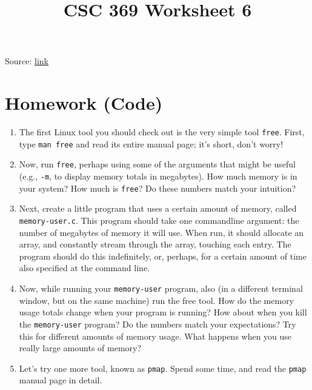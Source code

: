 \documentclass[12pt]{article}
\begin{document}
\title{CSC 369 Worksheet 6}
\maketitle

\bigskip

Source: \href{http://pages.cs.wisc.edu/~remzi/OSTEP/cpu-intro.pdf}{link}

\bigskip

\section{Homework (Code)}

\begin{enumerate}[1.]
    \item The first Linux tool you should check out is the very simple tool
    \texttt{free}. First, type \texttt{man free} and read its entire manual page; it’s
    short, don’t worry!

    \item Now, run \texttt{free}, perhaps using some of the arguments that might
    be useful (e.g., \texttt{-m}, to display memory totals in megabytes). How
    much memory is in your system? How much is \texttt{free}? Do these
    numbers match your intuition?

    \item Next, create a little program that uses a certain amount of memory,
    called \texttt{memory-user.c}. This program should take one commandline argument: the number of megabytes of memory it will use.
    When run, it should allocate an array, and constantly stream through
    the array, touching each entry. The program should do this indefinitely, or, perhaps, for a certain amount of time also specified at the
    command line.

    \item Now, while running your \texttt{memory-user} program, also (in a different terminal window, but on the same machine) run the free
    tool. How do the memory usage totals change when your program
    is running? How about when you kill the \texttt{memory-user} program?
    Do the numbers match your expectations? Try this for different
    amounts of memory usage. What happens when you use really
    large amounts of memory?

    \item Let’s try one more tool, known as \texttt{pmap}. Spend some time, and read
    the \texttt{pmap} manual page in detail.


\end{enumerate}
\end{document}
